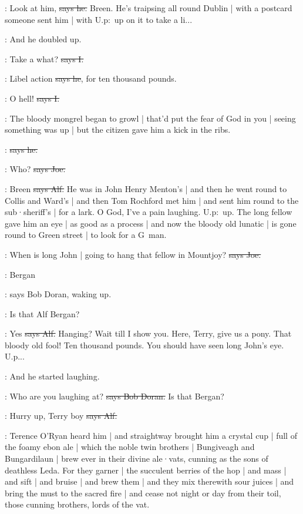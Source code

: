 \bergan:
Look at him,
\sout{says he.}
Breen.
He's traipsing all round Dublin |
with a postcard someone sent him |
with U.p:~up
on it to take a li...

\Nq:
And he doubled up.

:
Take a what?
\sout{says I.}

\bergan:
Libel action
\sout{says he},
for ten thousand pounds.

:
O hell!
\sout{says I.}

\Nq:
The bloody mongrel began to growl |
that'd put the fear of God in you |
seeing something was up |
but the citizen gave him a kick in the ribs.

\citizen:
\sout{says he.}

\joe:
Who?
\sout{says Joe.}

\bergan:
Breen
\sout{says Alf.}
He was in John Henry Menton's |
and then he went round to Collis and Ward's |
and then Tom Rochford met him |
and sent him round to the sub·sheriff's |
for a lark.
O God,
I've a pain laughing.
U.p:~up.
The long fellow gave him an eye |
as good as a process
 |
and now the bloody old lunatic |
is gone round to Green street |
to look for a G~man.

\joe:
When is long John |
going to hang that fellow in Mountjoy?
\sout{says Joe.}

\doran:
Bergan

\Nq:
says Bob Doran,
waking up.

\doran:
Is that Alf Bergan?

\bergan:
Yes
\sout{says Alf.}
Hanging?
Wait till I show you.
Here,
Terry,
give us a pony.
That bloody old fool!
Ten thousand pounds.
You should have seen long John's eye.
U.p...

\Nq:
And he started laughing.

\doran:
Who are you laughing at?
\sout{says Bob Doran.}
Is that Bergan?

\bergan:
Hurry up,
Terry boy
\sout{says Alf.}

:
Terence O'Ryan heard him
 |
and straightway brought him a crystal cup |
full of the foamy ebon ale |
which the noble twin brothers |
Bungiveagh and Bungardilaun |
brew ever in their divine ale·vats,
cunning as the sons of deathless Leda.
For they garner |
the succulent berries of the hop |
and mass |
and sift |
and bruise |
and brew them |
and they mix therewith sour juices |
and bring the must to the sacred fire |
and cease not night or day from their toil,
those cunning brothers,
lords of the vat.

